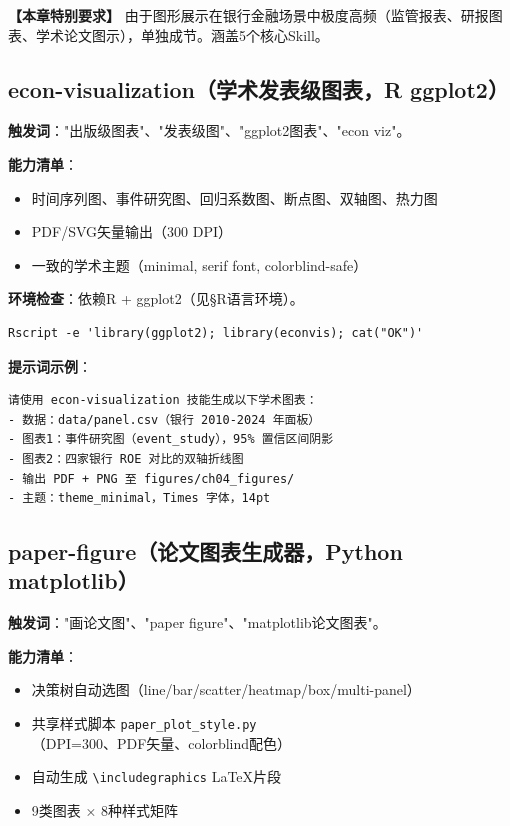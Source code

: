 \textbf{【本章特别要求】} 由于图形展示在银行金融场景中极度高频（监管报表、研报图表、学术论文图示），单独成节。涵盖5个核心Skill。

\subsection{econ-visualization（学术发表级图表，R ggplot2）}
\textbf{触发词}："出版级图表"、"发表级图"、"ggplot2图表"、"econ viz"。

\textbf{能力清单}：
\begin{itemize}[leftmargin=1em]
  \item 时间序列图、事件研究图、回归系数图、断点图、双轴图、热力图
  \item PDF/SVG矢量输出（300 DPI）
  \item 一致的学术主题（minimal, serif font, colorblind-safe）
\end{itemize}

\textbf{环境检查}：依赖R + ggplot2（见§R语言环境）。
\begin{lstlisting}[style=shell]
Rscript -e 'library(ggplot2); library(econvis); cat("OK")'
\end{lstlisting}

\textbf{提示词示例}：
\begin{lstlisting}
请使用 econ-visualization 技能生成以下学术图表：
- 数据：data/panel.csv（银行 2010-2024 年面板）
- 图表1：事件研究图（event_study），95% 置信区间阴影
- 图表2：四家银行 ROE 对比的双轴折线图
- 输出 PDF + PNG 至 figures/ch04_figures/
- 主题：theme_minimal，Times 字体，14pt
\end{lstlisting}

\subsection{paper-figure（论文图表生成器，Python matplotlib）}
\textbf{触发词}："画论文图"、"paper figure"、"matplotlib论文图表"。

\textbf{能力清单}：
\begin{itemize}[leftmargin=1em]
  \item 决策树自动选图（line/bar/scatter/heatmap/box/multi-panel）
  \item 共享样式脚本 \texttt{paper\_plot\_style.py}（DPI=300、PDF矢量、colorblind配色）
  \item 自动生成 \texttt{\textbackslash includegraphics} LaTeX片段
  \item 9类图表 × 8种样式矩阵
\end{itemize}

